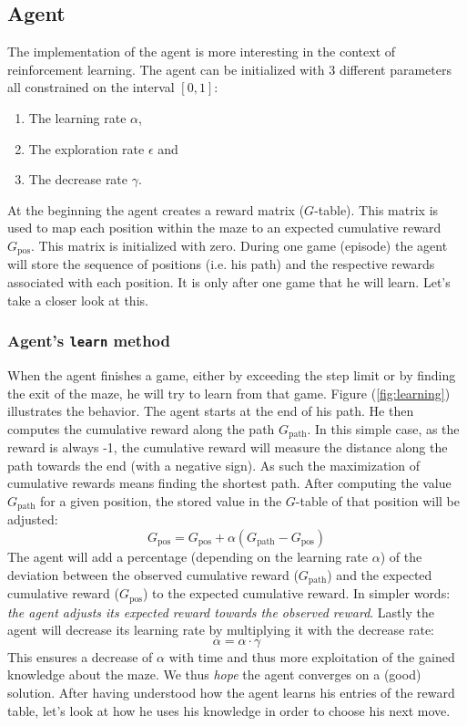 \documentclass[12pt,a4paper]{scrartcl}
\begin{document}
\subsection{Agent}

The implementation of the agent is more interesting in the context of
reinforcement learning.
The agent can be initialized with 3 different parameters all constrained on the
interval $[0,1]$:
\begin{enumerate}
    \item The learning rate $\alpha$,
    \item The exploration rate $\epsilon$ and
    \item The decrease rate $\gamma$.
\end{enumerate}
At the beginning the agent creates a reward matrix ($G$-table).
This matrix is used to map each position within the maze to an expected
cumulative reward $G_\mathrm{pos}$. This matrix is initialized with zero.
During one game (episode) the agent will store the sequence of positions (i.e.
his path) and the respective rewards associated with each position. It is only
after one game that he will learn. Let's take a closer look at this.

\subsubsection{Agent's \texttt{learn} method}
\label{sec:learn}
When the agent finishes a game, either by exceeding the step limit or by finding
the exit of the maze, he will try to learn from that game.
Figure (\ref{fig:learning}) illustrates the behavior.
The agent starts at the end of his path. He then computes the cumulative reward
along the path $G_\mathrm{path}$. In this simple case, as the reward is always
-1, the cumulative reward will measure the distance along the path towards the
end (with a negative sign). As such the maximization of cumulative rewards means
finding the shortest path. After computing the value $G_\mathrm{path}$ for a
given position, the stored value in the $G$-table of that position will be
adjusted:
\begin{equation}
    G_\mathrm{pos} = G_\mathrm{pos} + \alpha(G_\mathrm{path} - G_\mathrm{pos})
    \label{eq:learning}
\end{equation}
The agent will add a percentage (depending on the learning rate $\alpha$) of the
deviation between the observed cumulative reward ($G_\mathrm{path}$) and the
expected cumulative reward ($G_\mathrm{pos}$) to the expected cumulative reward.
In simpler words: \textit{the agent adjusts its expected reward towards the
observed reward}.
Lastly the agent will decrease its learning rate by multiplying it with the
decrease rate:
\begin{equation}
    \alpha = \alpha \cdot \gamma
\end{equation}
This ensures a decrease of $\alpha$ with time and thus more exploitation of the
gained knowledge about the maze. We thus \textit{hope} the agent converges on a
(good) solution.
After having understood how the agent learns his entries of the reward
table, let's look at how he uses his knowledge in order to choose his next move.
\end{document}
